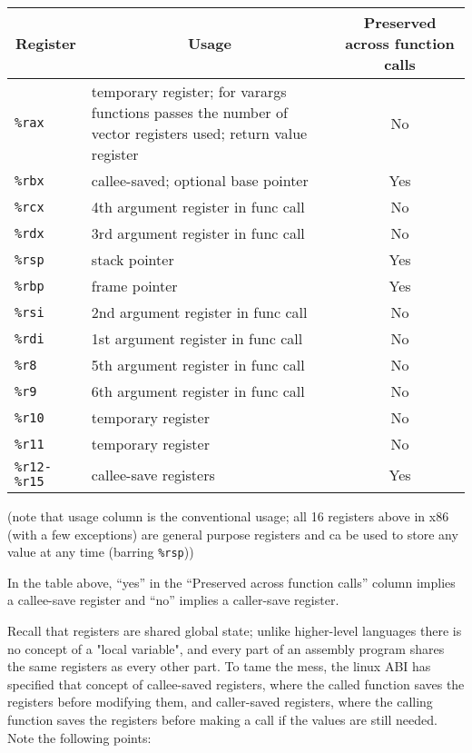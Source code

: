 \documentclass[11pt]{article}
\begin{document}
\begin{tabular}{ l | p{9cm} | c }
    \multicolumn{1}{c}{Register} & \multicolumn{1}{c}{Usage} &
    \multicolumn{1}{p{3cm}}{Preserved across function calls} \\\hline
    \texttt{\%rax} & temporary register; for varargs functions passes the number of vector
        registers used; return value register & No \\
    \texttt{\%rbx} & callee-saved; optional base pointer & Yes \\
    \texttt{\%rcx} & 4th argument register in func call & No \\
    \texttt{\%rdx} & 3rd argument register in func call & No \\
    \texttt{\%rsp} & stack pointer & Yes \\
    \texttt{\%rbp} & frame pointer & Yes \\
    \texttt{\%rsi} & 2nd argument register in func call & No \\
    \texttt{\%rdi} & 1st argument register in func call & No \\
    \texttt{\%r8}  & 5th argument register in func call & No \\
    \texttt{\%r9}  & 6th argument register in func call & No \\
    \texttt{\%r10} & temporary register & No \\
    \texttt{\%r11} & temporary register & No \\
    \texttt{\%r12-\%r15} & callee-save registers & Yes
\end{tabular}

(note that usage column is the conventional usage; all 16 registers above in x86 (with a few
exceptions) are general purpose registers and ca be used to store any value at any time
(barring \texttt{\%rsp}))

In the table above, ``yes'' in the ``Preserved across function calls'' column implies a
callee-save register and ``no'' implies a caller-save register.

Recall that registers are shared global state; unlike higher-level languages there is no
concept of a "local variable", and every part of an assembly program shares the same
registers as every other part. To tame the mess, the linux ABI has specified that concept
of callee-saved registers, where the called function saves the registers before
modifying them, and caller-saved registers, where the calling function saves the registers
before making a call if the values are still needed. Note the following points:
\end{document}
